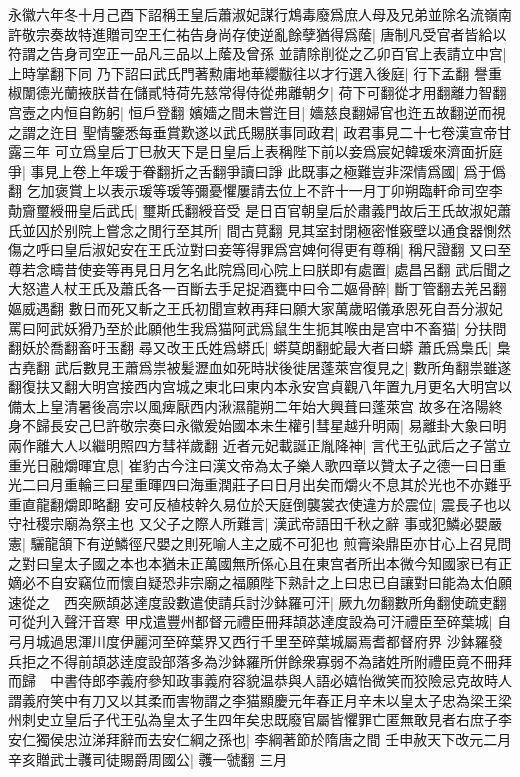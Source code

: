 永徽六年冬十月己酉下詔稱王皇后蕭淑妃謀行鴆毒廢爲庶人母及兄弟並除名流嶺南許敬宗奏故特進贈司空王仁祐告身尚存使逆亂餘孽猶得爲䕃|{
	唐制凡受官者皆給以符謂之告身司空正一品凡三品以上䕃及曾孫}
並請除削從之乙卯百官上表請立中宫|{
	上時掌翻下同}
乃下詔曰武氏門著勲庸地華纓黻往以才行選入後庭|{
	行下孟翻}
譽重椒闈德光蘭掖朕昔在儲貳特荷先慈常得侍從弗離朝夕|{
	荷下可翻從才用翻離力智翻}
宫壼之内恒自飭躬|{
	恒戶登翻}
嬪嬙之間未嘗迕目|{
	嬙慈良翻婦官也迕五故翻逆而視之謂之迕目}
聖情鑒悉每垂賞歎遂以武氏賜朕事同政君|{
	政君事見二十七卷漢宣帝甘露三年}
可立爲皇后丁巳赦天下是日皇后上表稱陛下前以妾爲宸妃韓瑗來濟面折庭爭|{
	事見上卷上年瑗于眷翻折之舌翻爭讀曰諍}
此既事之極難豈非深情爲國|{
	爲于僞翻}
乞加褒賞上以表示瑗等瑗等彌憂懼屢請去位上不許十一月丁卯朔臨軒命司空李勣齎璽綬冊皇后武氏|{
	璽斯氏翻綬音受}
是日百官朝皇后於肅義門故后王氏故淑妃蕭氏並囚於别院上嘗念之閒行至其所|{
	間古莧翻}
見其室封閉極密惟竅壁以通食器惻然傷之呼曰皇后淑妃安在王氏泣對曰妾等得罪爲宫婢何得更有尊稱|{
	稱尺證翻}
又曰至尊若念疇昔使妾等再見日月乞名此院爲囘心院上曰朕即有處置|{
	處昌呂翻}
武后聞之大怒遣人杖王氏及蕭氏各一百斷去手足捉酒甕中曰令二嫗骨醉|{
	斷丁管翻去羌呂翻嫗威遇翻}
數日而死又斬之王氏初聞宣敕再拜曰願大家萬歲昭儀承恩死自吾分淑妃罵曰阿武妖猾乃至於此願他生我爲猫阿武爲鼠生生扼其喉由是宫中不畜猫|{
	分扶問翻妖於喬翻畜吁玉翻}
尋又改王氏姓爲蟒氏|{
	蟒莫朗翻蛇最大者曰蟒}
蕭氏爲梟氏|{
	梟古堯翻}
武后數見王蕭爲祟被髪瀝血如死時狀後徙居蓬萊宫復見之|{
	數所角翻祟雖遂翻復扶又翻大明宫接西内宫城之東北曰東内本永安宫貞觀八年置九月更名大明宫以備太上皇清暑後高宗以風痺厭西内湫濕龍朔二年始大興葺曰蓬萊宫}
故多在洛陽終身不歸長安己巳許敬宗奏曰永徽爰始國本未生權引彗星越升明兩|{
	易離卦大象曰明兩作離大人以繼明照四方彗祥歲翻}
近者元妃載誕正胤降神|{
	言代王弘武后之子當立}
重光日融爝暉宜息|{
	崔豹古今注曰漢文帝為太子樂人歌四章以贊太子之德一曰日重光二曰月重輪三曰星重暉四曰海重潤莊子曰日月出矣而爝火不息其於光也不亦難乎重直龍翻爝即略翻}
安可反植枝幹久易位於天庭倒襲裳衣使違方於震位|{
	震長子也以守社稷宗廟為祭主也}
又父子之際人所難言|{
	漢武帝語田千秋之辭}
事或犯鱗必嬰嚴憲|{
	驪龍頷下有逆鱗徑尺嬰之則死喻人主之威不可犯也}
煎膏染鼎臣亦甘心上召見問之對曰皇太子國之本也本猶未正萬國無所係心且在東宫者所出本微今知國家已有正嫡必不自安竊位而懷自疑恐非宗廟之福願陛下熟計之上曰忠已自讓對曰能為太伯願速從之　西突厥頡苾達度設數遣使請兵討沙鉢羅可汗|{
	厥九勿翻數所角翻使疏吏翻可從刋入聲汗音寒}
甲戍遣豐州都督元禮臣冊拜頡苾達度設為可汗禮臣至碎葉城|{
	自弓月城過思渾川度伊麗河至碎葉界又西行千里至碎葉城屬焉耆都督府界}
沙鉢羅發兵拒之不得前頡苾逹度設部落多為沙鉢羅所併餘衆寡弱不為諸姓所附禮臣竟不冊拜而歸　中書侍郎李義府參知政事義府容貌温恭與人語必嬉怡微笑而狡險忌克故時人謂義府笑中有刀又以其柔而害物謂之李猫顯慶元年春正月辛未以皇太子忠為梁王梁州刺史立皇后子代王弘為皇太子生四年矣忠既廢官屬皆懼罪亡匿無敢見者右庶子李安仁獨侯忠泣涕拜辭而去安仁綱之孫也|{
	李綱著節於隋唐之間}
壬申赦天下改元二月辛亥贈武士彠司徒賜爵周國公|{
	彠一虢翻}
三月

